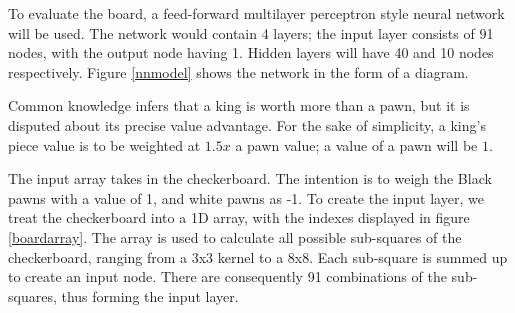 \documentclass[12pt,a4paper]{article}
\newcommand{\wh}{\node [ball, ball color=white] {};}
\begin{document}
%        
        To evaluate the board, a feed-forward multilayer perceptron style neural network will be used. The network would contain 4 layers; the input layer consists of 91 nodes, with the output node having 1. Hidden layers will have 40 and 10 nodes respectively. Figure \ref{nnmodel} shows the network in the form of a diagram.

        Common knowledge infers that a king is worth more than a pawn, but it is disputed about its precise value advantage. For the sake of simplicity, a king's piece value is to be weighted at $1.5x$ a pawn value; a value of a pawn will be $1$. 

        The input array takes in the checkerboard. The intention is to weigh the Black pawns with a value of 1, and white pawns as -1. To create the input layer, we treat the checkerboard into a 1D array, with the indexes displayed in figure \ref{boardarray}. The array is used to calculate all possible sub-squares of the checkerboard, ranging from a 3x3 kernel to a 8x8. Each sub-square is summed up to create an input node. There are consequently 91 combinations of the sub-squares, thus forming the input layer. 
\end{document}

